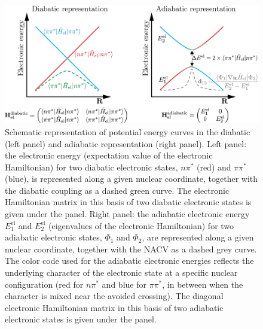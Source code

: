 \documentclass[9pt,bestpractices]{livecoms}
\begin{document}
\begin{figure}[h!]
    \centering
    \includegraphics[width=0.8\linewidth]{./figures/diabatic_adiabatic.png}
    \caption{Schematic representation of potential energy curves in the diabatic (left panel) and adiabatic representation (right panel). Left panel: the electronic energy (expectation value of the electronic Hamiltonian) for two diabatic electronic states, $n\pi^\ast$ (red) and $\pi\pi^\ast$ (blue), is represented along a given nuclear coordinate, together with the diabatic coupling as a dashed green curve. The electronic Hamiltonian matrix in this basis of two diabatic electronic states is given under the panel. Right panel: the adiabatic electronic energy $E_1^{\text{el}}$ and $E_2^{\text{el}}$ (eigenvalues of the electronic Hamiltonian) for two adiabatic electronic states, $\Phi_1$ and $\Phi_2$, are represented along a given nuclear coordinate, together with the NACV as a dashed grey curve. The color code used for the adiabatic electronic energies reflects the underlying character of the electronic state at a specific nuclear configuration (red for $n\pi^\ast$ and blue for $\pi\pi^\ast$, in between when the character is mixed near the avoided crossing). The diagonal electronic Hamiltonian matrix in this basis of two adiabatic electronic states is given under the panel. }
    \label{adiadia}
\end{figure}
\end{document}
